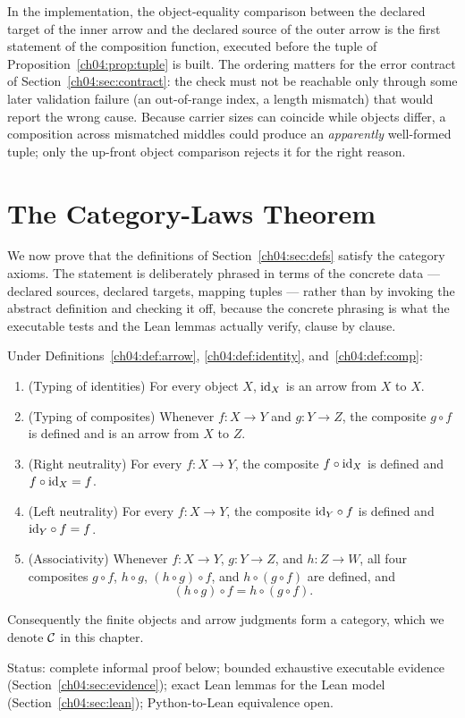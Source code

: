 \begin{remark}
\label{ch04:rem:checksite}
In the implementation, the object-equality comparison between the declared
target of the inner arrow and the declared source of the outer arrow is
the first statement of the composition function, executed before the tuple
of Proposition~\ref{ch04:prop:tuple} is built. The ordering matters for
the error contract of Section~\ref{ch04:sec:contract}: the check must not
be reachable only through some later validation failure (an out-of-range
index, a length mismatch) that would report the wrong cause. Because
carrier sizes can coincide while objects differ, a composition across
mismatched middles could produce an \emph{apparently} well-formed tuple;
only the up-front object comparison rejects it for the right reason.
\end{remark}

\section{The Category-Laws Theorem}
\label{ch04:sec:laws}

We now prove that the definitions of Section~\ref{ch04:sec:defs} satisfy the
category axioms. The statement is deliberately phrased in terms of the
concrete data --- declared sources, declared targets, mapping tuples ---
rather than by invoking the abstract definition and checking it off, because
the concrete phrasing is what the executable tests and the Lean lemmas
actually verify, clause by clause.

\begin{theorem}
\label{ch04:thm:laws}
Under Definitions~\ref{ch04:def:arrow}, \ref{ch04:def:identity},
and~\ref{ch04:def:comp}:
\begin{enumerate}
\item \textup{(Typing of identities)} For every object $X$, $\mathrm{id}_X$ is an
arrow from $X$ to $X$.
\item \textup{(Typing of composites)} Whenever $f : X \to Y$ and
$g : Y \to Z$, the composite $g \circ f$ is defined and is an arrow from $X$
to $Z$.
\item \textup{(Right neutrality)} For every $f : X \to Y$, the composite
$f \circ \mathrm{id}_X$ is defined and $f \circ \mathrm{id}_X = f$.
\item \textup{(Left neutrality)} For every $f : X \to Y$, the composite
$\mathrm{id}_Y \circ f$ is defined and $\mathrm{id}_Y \circ f = f$.
\item \textup{(Associativity)} Whenever $f : X \to Y$, $g : Y \to Z$, and
$h : Z \to W$, all four composites $g \circ f$, $h \circ g$,
$(h \circ g) \circ f$, and $h \circ (g \circ f)$ are defined, and
\[
  (h \circ g) \circ f = h \circ (g \circ f).
\]
\end{enumerate}
Consequently the finite objects and arrow judgments form a category, which
we denote $\mathcal{C}$ in this chapter.

\textup{Status: complete informal proof below; bounded exhaustive executable
evidence (Section~\ref{ch04:sec:evidence}); exact Lean lemmas for the Lean
model (Section~\ref{ch04:sec:lean}); Python-to-Lean equivalence open.}
\end{theorem}

